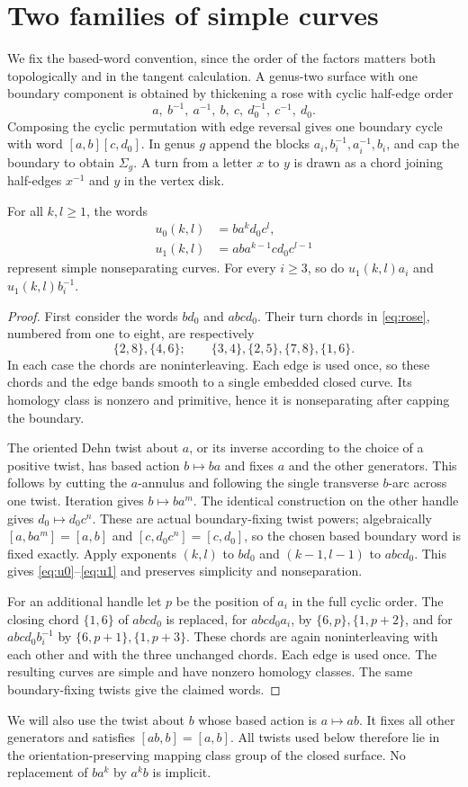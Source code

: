 \section{Two families of simple curves}\label{sec:curves}
We fix the based-word convention, since the order of the factors matters
both topologically and in the tangent calculation. A genus-two surface
with one boundary component is obtained by thickening a rose with cyclic
half-edge order
\begin{equation}\label{eq:rose}
 a,\ b^{-1},\ a^{-1},\ b,\ c,\ d_0^{-1},\ c^{-1},\ d_0.
\end{equation}
Composing the cyclic permutation with edge reversal gives one boundary
cycle with word $[a,b][c,d_0]$. In genus $g$ append the blocks
$a_i,b_i^{-1},a_i^{-1},b_i$, and cap the boundary to obtain $\Sigma_g$.
A turn from a letter $x$ to $y$ is drawn as a chord joining half-edges
$x^{-1}$ and $y$ in the vertex disk.

\begin{lemma}\label{lem:curves}
For all $k,l\geq1$, the words
\begin{align}
 u_0(k,l)&=b a^k d_0 c^l,\label{eq:u0}\\
 u_1(k,l)&=a b a^{k-1}c d_0 c^{l-1}\label{eq:u1}
\end{align}
represent simple nonseparating curves. For every $i\geq3$, so do
$u_1(k,l)a_i$ and $u_1(k,l)b_i^{-1}$.
\end{lemma}
\begin{proof}
First consider the words $bd_0$ and $abcd_0$. Their turn chords in
\eqref{eq:rose}, numbered from one to eight, are respectively
\[
 \{2,8\},\{4,6\};\qquad
 \{3,4\},\{2,5\},\{7,8\},\{1,6\}.
\]
In each case the chords are noninterleaving. Each edge is used once,
so these chords and the edge bands smooth to a single embedded closed
curve. Its homology class is nonzero and primitive, hence it is
nonseparating after capping the boundary.

The oriented Dehn twist about $a$, or its inverse according to the choice
of a positive twist, has based action $b\mapsto ba$ and fixes $a$ and the
other generators. This follows by cutting the $a$-annulus and following the
single transverse $b$-arc across one twist. Iteration gives
$b\mapsto ba^m$. The identical construction on the other handle gives
$d_0\mapsto d_0c^n$. These are actual boundary-fixing twist powers;
algebraically $[a,ba^m]=[a,b]$ and $[c,d_0c^n]=[c,d_0]$, so the chosen
based boundary word is fixed exactly. Apply exponents $(k,l)$ to $bd_0$
and $(k-1,l-1)$ to $abcd_0$. This gives \eqref{eq:u0}--\eqref{eq:u1}
and preserves simplicity and nonseparation.

For an additional handle let $p$ be the position of $a_i$ in the full
cyclic order. The closing chord $\{1,6\}$ of $abcd_0$ is replaced, for
$abcd_0a_i$, by $\{6,p\},\{1,p+2\}$, and for $abcd_0b_i^{-1}$ by
$\{6,p+1\},\{1,p+3\}$. These chords are again noninterleaving with each
other and with the three unchanged chords. Each edge is used once.
The resulting curves are simple and have nonzero homology classes.
The same boundary-fixing twists give the claimed words.
\end{proof}

We will also use the twist about $b$ whose based action is $a\mapsto ab$.
It fixes all other generators and satisfies $[ab,b]=[a,b]$. All twists
used below therefore lie in the orientation-preserving mapping class group
of the closed surface. No replacement of $ba^k$ by $a^kb$ is implicit.
